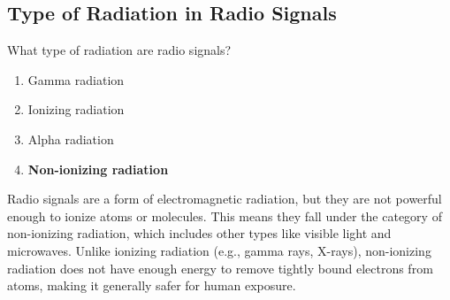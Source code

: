 \subsection{Type of Radiation in Radio Signals}
\label{T0C01}

\begin{tcolorbox}[colback=gray!10!white,colframe=black!75!black,title=T0C01]
What type of radiation are radio signals?
\begin{enumerate}[noitemsep]
    \item Gamma radiation
    \item Ionizing radiation
    \item Alpha radiation
    \item \textbf{Non-ionizing radiation}
\end{enumerate}
\end{tcolorbox}

Radio signals are a form of electromagnetic radiation, but they are not powerful enough to ionize atoms or molecules. This means they fall under the category of non-ionizing radiation, which includes other types like visible light and microwaves. Unlike ionizing radiation (e.g., gamma rays, X-rays), non-ionizing radiation does not have enough energy to remove tightly bound electrons from atoms, making it generally safer for human exposure.